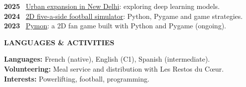 \documentclass[10pt,a4paper]{extarticle}
\newcommand{\cvsection}[1]{%
  \vspace{9pt}
  {\fontsize{10.5}{12.5}\selectfont\bfseries\color{CVAccent}\MakeUppercase{#1}}\par
  \vspace{3pt}{\color{CVGray!35}\hrule height .45pt}\vspace{4pt}}
\begin{document}
\textbf{2025} \textbar\ \href{https://github.com/nathan-robert/prediction-of-the-urbanization-of-New-Delhi}{Urban expansion in New Delhi}: exploring deep learning models.\\[1.6pt]
\textbf{2024} \textbar\ \href{https://github.com/nathan-robert/Football-Match-simulation}{2D five-a-side football simulator}: Python, Pygame and game strategies.\\[1.6pt]
\textbf{2023} \textbar\ \href{https://github.com/nathan-robert/Pymon}{Pymon}: a 2D fan game built with Python and Pygame (ongoing).

\cvsection{LANGUAGES \& ACTIVITIES}

\textbf{Languages:} French (native), English (C1), Spanish (intermediate).\\[1.6pt]
\textbf{Volunteering:} Meal service and distribution with Les Restos du Cœur.\\[1.6pt]
\textbf{Interests:} Powerlifting, football, programming.
\end{document}
